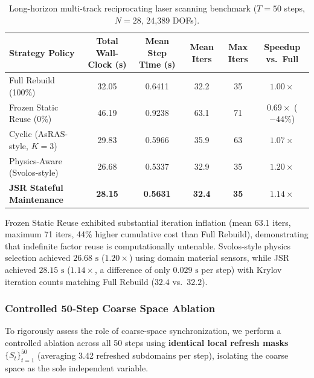 \documentclass[preprint,12pt,3p]{elsarticle}
\begin{document}
\begin{table}[htbp]
\centering
\small
\caption{Long-horizon multi-track reciprocating laser scanning benchmark ($T=50$ steps, $N=28$, 24,389 DOFs).}
\label{tab:long_horizon}
\begin{tabular}{lccccc}
\toprule
\textbf{Strategy Policy} & \textbf{Total Wall-Clock (s)} & \textbf{Mean Step Time (s)} & \textbf{Mean Iters} & \textbf{Max Iters} & \textbf{Speedup vs.\ Full} \\
\midrule
Full Rebuild (100\%) & 32.05 & 0.6411 & 32.2 & 35 & $1.00\times$ \\
Frozen Static Reuse (0\%) & 46.19 & 0.9238 & 63.1 & 71 & $0.69\times$ ($-44\%$) \\
Cyclic (AsRAS-style, $K=3$) & 29.83 & 0.5966 & 35.9 & 63 & $1.07\times$ \\
Physics-Aware (Svolos-style) & 26.68 & 0.5337 & 32.9 & 35 & $1.20\times$ \\
\textbf{JSR Stateful Maintenance} & \textbf{28.15} & \textbf{0.5631} & \textbf{32.4} & \textbf{35} & $\mathbf{1.14\times}$ \\
\bottomrule
\end{tabular}
\end{table}

Frozen Static Reuse exhibited substantial iteration inflation (mean 63.1 iters, maximum 71 iters, 44\% higher cumulative cost than Full Rebuild), demonstrating that indefinite factor reuse is computationally untenable. Svolos-style physics selection achieved $26.68\text{ s}$ ($1.20\times$) using domain material sensors, while JSR achieved $28.15\text{ s}$ ($1.14\times$, a difference of only $0.029\text{ s}$ per step) with Krylov iteration counts matching Full Rebuild ($32.4$ vs.\ $32.2$).

\subsubsection{Controlled 50-Step Coarse Space Ablation}
To rigorously assess the role of coarse-space synchronization, we perform a controlled ablation across all 50 steps using \textbf{identical local refresh masks} $\{S_t\}_{t=1}^{50}$ (averaging 3.42 refreshed subdomains per step), isolating the coarse space as the sole independent variable.
\end{document}

